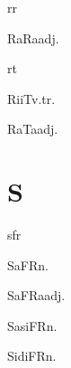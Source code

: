 \begin{multicols*}{2}
\begin{dictroot}{r}{r}
    \begin{dictentry}{RaRa}{adj.}
    \end{dictentry}
\end{dictroot}

\begin{dictroot}{r}{t}
    \begin{dictentry}{RiiT}{v.tr.}
    \end{dictentry}
    \begin{dictentry}{RaTa}{adj.}
    \end{dictentry}
\end{dictroot}

\section*{S}

\begin{dictroot}{s}{fr}
    \begin{dictentry}{SaFR}{n.}
    \end{dictentry}
    \begin{dictentry}{SaFRa}{adj.}
    \end{dictentry}
    \begin{dictentry}{SasiFR}{n.}
    \end{dictentry}
    \begin{dictentry}{SidiFR}{n.}
    \end{dictentry}
\end{dictroot}


\end{multicols*}
